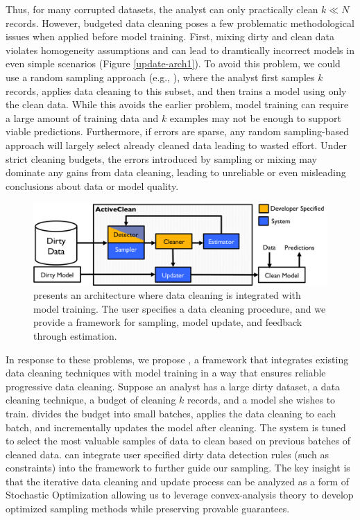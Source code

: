Thus, for many corrupted datasets, the analyst can only practically clean $k \ll N$ records.
However, budgeted data cleaning poses a few problematic methodological issues when applied before model training.
First, mixing dirty and clean data violates homogeneity assumptions and can lead to dramtically incorrect models in even simple scenarios (Figure \ref{update-arch1}).
To avoid this problem, we could use a random sampling approach (e.g., \cite{wang1999sample}), where the analyst first samples $k$ records, applies data cleaning to this subset, and then trains a model using only the clean data.
While this avoids the earlier problem, model training can require a large amount of training data and $k$ examples may not be enough to support viable predictions.
Furthermore, if errors are sparse, any random sampling-based approach will largely select already cleaned data leading to wasted effort.
Under strict cleaning budgets, the errors introduced by sampling or mixing may dominate any gains from data cleaning, leading to unreliable or even misleading conclusions about data or model quality.

\begin{figure}[t]
\centering
 \includegraphics[width=\columnwidth]{figs/arch.png}
 \caption{\sysfull presents an architecture where data cleaning is integrated with model training. The user specifies a data cleaning procedure, and we provide a framework for sampling, model update, and feedback through estimation. \label{sys-arch}}\vspace{-2em}
\end{figure}

In response to these problems, we propose \sys, a framework that integrates existing data cleaning techniques with model training in a way that ensures reliable progressive data cleaning.
Suppose an analyst has a large dirty dataset, a data cleaning technique, a budget of cleaning $k$ records, and a model she wishes to train.
\sys divides the budget into small batches, applies the data cleaning to each batch, and incrementally updates the model after cleaning.
The system is tuned to select the most valuable samples of data to clean based on previous batches of cleaned data. 
\sys can integrate user specified dirty data detection rules (such as constraints) into the framework to further guide our sampling.
The key insight is that the iterative data cleaning and update process can be analyzed as a form of Stochastic Optimization \cite{bertsekas2011incremental} allowing us to leverage convex-analysis theory to develop optimized sampling methods while preserving provable guarantees.

